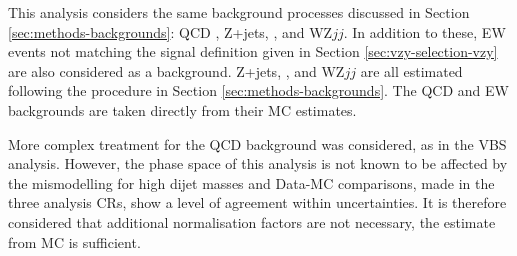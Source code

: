 
This analysis considers the same background processes discussed in Section
\ref{sec:methods-backgrounds}: \ac{QCD} \Zy, Z+jets, \tty, and WZ$jj$. In
addition to these, \ac{EW} \Zyjj events not matching the signal definition given
in Section \ref{sec:vzy-selection-vzy} are also considered as a background.
Z+jets, \tty, and WZ$jj$ are all estimated following the procedure in Section
\ref{sec:methods-backgrounds}.
The \ac{QCD} \Zy and \ac{EW} \Zyjj backgrounds are taken directly from
their \ac{MC} estimates.

More complex treatment for the \ac{QCD} \Zy background was considered, as in the
\ac{VBS} \Zy analysis. However, the phase space of this analysis is not known to
be affected by the mismodelling for high dijet masses and Data-\ac{MC}
comparisons, made in the three analysis \acp{CR}, show a level of agreement
within uncertainties. It is therefore considered that additional normalisation
factors are not necessary, the estimate from \ac{MC} is sufficient.
